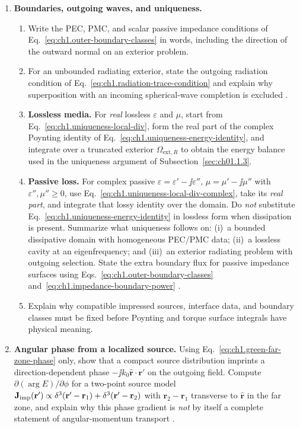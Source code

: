 \begin{enumerate}
\item \textbf{Boundaries, outgoing waves, and uniqueness.}
\begin{enumerate}[label=(\alph*)]
\item Write the PEC, PMC, and scalar passive impedance conditions of Eq.~\eqref{eq:ch1.outer-boundary-classes} in words, including the direction of the outward normal on an exterior problem.
\item For an unbounded radiating exterior, state the outgoing radiation condition of Eq.~\eqref{eq:ch1.radiation-trace-condition} and explain why superposition with an incoming spherical-wave completion is excluded \cite{sommerfeld1949}.
\item \textbf{Lossless media.} For \emph{real} lossless $\varepsilon$ and $\mu$, start from Eq.~\eqref{eq:ch1.uniqueness-local-div}, form the real part of the complex Poynting identity of Eq.~\eqref{eq:ch1.uniqueness-energy-identity}, and integrate over a truncated exterior $\Omega_{\mathrm{ext},R}$ to obtain the energy balance used in the uniqueness argument of Subsection~\ref{sec:ch01.1.3}.
\item \textbf{Passive loss.} For complex passive $\varepsilon=\varepsilon'-\jj\varepsilon''$, $\mu=\mu'-\jj\mu''$ with $\varepsilon'',\mu''\ge0$, use Eq.~\eqref{eq:ch1.uniqueness-local-div-complex}, take its \emph{real part}, and integrate that lossy identity over the domain. Do \emph{not} substitute Eq.~\eqref{eq:ch1.uniqueness-energy-identity} in lossless form when dissipation is present. Summarize what uniqueness follows on: (i)~a bounded dissipative domain with homogeneous PEC/PMC data; (ii)~a lossless cavity at an eigenfrequency; and (iii)~an exterior radiating problem with outgoing selection. State the extra boundary flux for passive impedance surfaces using Eqs.~\eqref{eq:ch1.outer-boundary-classes} and~\eqref{eq:ch1.impedance-boundary-power} \cite{stratton1941,harrington2001}.
\item Explain why compatible impressed sources, interface data, and boundary classes must be fixed before Poynting and torque surface integrals have physical meaning.
\end{enumerate}

\item \textbf{Angular phase from a localized source.}
Using Eq.~\eqref{eq:ch1.green-far-zone-phase} only, show that a compact source distribution imprints a direction-dependent phase $-\jj k_0\hat{\mathbf{r}}\cdot\mathbf{r}'$ on the outgoing field. Compute $\partial(\arg E)/\partial\phi$ for a two-point source model $\mathbf{J}_{\mathrm{imp}}(\mathbf{r}')\propto\delta^3(\mathbf{r}'-\mathbf{r}_1)+\delta^3(\mathbf{r}'-\mathbf{r}_2)$ with $\mathbf{r}_2-\mathbf{r}_1$ transverse to $\hat{\mathbf{r}}$ in the far zone, and explain why this phase gradient is \emph{not} by itself a complete statement of angular-momentum transport \cite{stratton1941}.


\end{enumerate}
